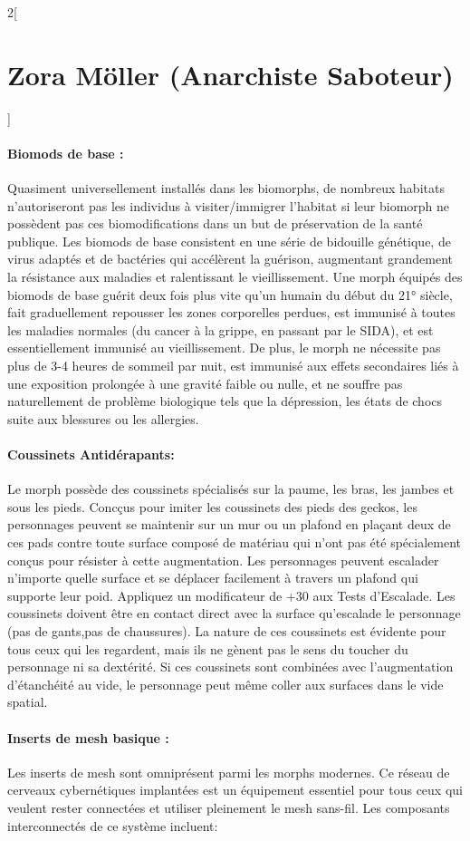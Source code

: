 \documentclass[a4paper,9pt]{article}
\begin{document}
\begin{multicols}{2}[\section*{Zora Möller (Anarchiste Saboteur)}]
\paragraph{Biomods de base :} 
Quasiment universellement  installés dans les biomorphs, de nombreux habitats
n'autoriseront pas les individus à visiter/immigrer l'habitat si leur biomorph
ne possèdent pas ces biomodifications dans un but de préservation de la santé
publique. Les biomods de base consistent en une série de bidouille génétique,
de virus adaptés et de bactéries qui accélèrent la guérison, augmentant
grandement la résistance aux maladies et ralentissant le vieillissement. Une
morph équipés des biomods de base guérit deux fois plus vite qu'un humain du
début du 21° siècle, fait graduellement repousser les zones corporelles
perdues, est immunisé à toutes les maladies normales (du cancer à la grippe, en
passant par le SIDA), et est essentiellement immunisé au vieillissement. De
plus, le morph ne nécessite pas plus de 3-4 heures de sommeil par nuit, est
immunisé aux effets secondaires liés à une exposition prolongée à une gravité
faible ou nulle, et ne souffre pas naturellement de problème biologique tels
que la dépression, les états de chocs suite aux blessures ou les allergies.

\paragraph{Coussinets Antidérapants:} Le morph possède des coussinets spécialisés
sur la paume, les bras, les jambes et sous les pieds. Concçus pour imiter les
coussinets des pieds des geckos, les personnages peuvent se maintenir sur un mur
ou un plafond en plaçant deux de ces pads contre toute surface composé de
matériau qui n'ont pas été spécialement conçus pour résister à cette
augmentation. Les personnages peuvent escalader n'importe quelle surface et se
déplacer facilement à travers un plafond qui supporte leur poid. Appliquez un
modificateur de +30 aux Tests d'Escalade. Les coussinets doivent être en contact
direct avec la surface qu'escalade le personnage (pas de gants,pas de
chaussures). La nature de ces coussinets est évidente pour tous ceux qui les
regardent, mais ils ne gènent pas le sens du toucher du personnage ni sa
dextérité. Si ces coussinets sont combinées avec l'augmentation d'étanchéité au
vide, le personnage peut même coller aux surfaces dans le vide spatial.

\paragraph{Inserts de mesh basique :} 
Les inserts de mesh sont omniprésent parmi les morphs modernes. Ce réseau de
cerveaux cybernétiques implantées est un équipement essentiel pour tous ceux
qui veulent rester connectées et utiliser pleinement le mesh sans-fil. Les
composants interconnectés de ce système incluent: 


\end{multicols}
\end{document}
